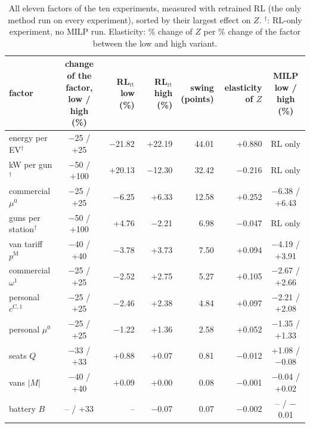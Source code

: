 \begin{table}[H]\centering
\scriptsize
\caption{All eleven factors of the ten experiments, measured with retrained RL (the only method run on every experiment), sorted by their largest effect on $Z$. $^{\dagger}$: RL-only experiment, no MILP run. Elasticity: \% change of $Z$ per \% change of the factor between the low and high variant.}\label{tab:tornadorl}
\begin{adjustbox}{max width=\textwidth}\begin{tabular}{lcrrrrc}\toprule
factor & \shortstack{change of the\\factor, low / high (\%)} & \shortstack{RL$_{\mathrm{rt}}$\\low (\%)} & \shortstack{RL$_{\mathrm{rt}}$\\high (\%)} & \shortstack{swing\\(points)} & \shortstack{elasticity\\of $Z$} & \shortstack{MILP low / high\\(\%)} \\ \midrule
energy per EV$^{\dagger}$ & $-$25 / +25 & $-$21.82 & +22.19 & 44.01 & +0.880 & RL only \\
kW per gun$^{\dagger}$ & $-$50 / +100 & +20.13 & $-$12.30 & 32.42 & $-$0.216 & RL only \\
commercial $\mu^{0}$ & $-$25 / +25 & $-$6.25 & +6.33 & 12.58 & +0.252 & $-$6.38 / +6.43 \\
guns per station$^{\dagger}$ & $-$50 / +100 & +4.76 & $-$2.21 & 6.98 & $-$0.047 & RL only \\
van tariff $p^{\mathrm M}$ & $-$40 / +40 & $-$3.78 & +3.73 & 7.50 & +0.094 & $-$4.19 / +3.91 \\
commercial $\omega^{1}$ & $-$25 / +25 & $-$2.52 & +2.75 & 5.27 & +0.105 & $-$2.67 / +2.66 \\
personal $c^{\mathrm C,1}$ & $-$25 / +25 & $-$2.46 & +2.38 & 4.84 & +0.097 & $-$2.21 / +2.08 \\
personal $\mu^{0}$ & $-$25 / +25 & $-$1.22 & +1.36 & 2.58 & +0.052 & $-$1.35 / +1.33 \\
seats $Q$ & $-$33 / +33 & +0.88 & +0.07 & 0.81 & $-$0.012 & +1.08 / $-$0.08 \\
vans $|M|$ & $-$40 / +40 & +0.09 & +0.00 & 0.08 & $-$0.001 & $-$0.04 / +0.02 \\
battery $B$ & -- / +33 & -- & $-$0.07 & 0.07 & $-$0.002 & -- / $-$0.01 \\
\bottomrule\end{tabular}\end{adjustbox}\end{table}
